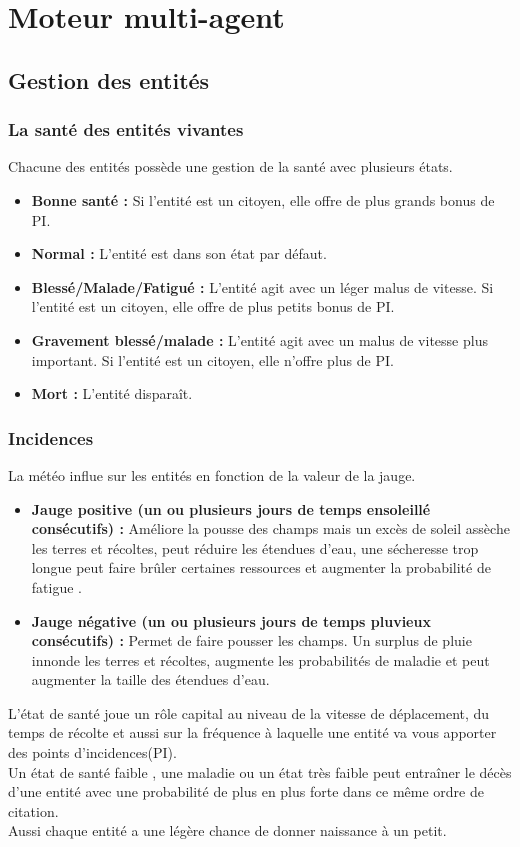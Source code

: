 \documentclass[a4paper]{memoir}
\begin{document}
		\section{Moteur multi-agent}
		
			\subsection{Gestion des entités}
			
				\subsubsection{La santé des entités vivantes}
					Chacune des entités possède une gestion de la santé avec plusieurs états.
					\begin{itemize}[label=$\bullet$]
						\item \textbf{Bonne santé :} Si l'entité est un citoyen, elle offre de plus grands bonus de PI.
						\item \textbf{Normal :} L'entité est dans son état par défaut.
						\item \textbf{Blessé/Malade/Fatigué :} L'entité agit avec un léger malus de vitesse. Si l'entité est un citoyen, elle offre de plus petits bonus de PI.
						\item \textbf{Gravement blessé/malade :} L'entité agit avec un malus de vitesse plus important. Si l'entité est un citoyen, elle n'offre plus de PI.
						\item \textbf{Mort :} L'entité disparaît.
					\end{itemize}
					
				\subsubsection{Incidences}
					\label{IncidenceE}
					La météo influe sur les entités en fonction de la valeur de la jauge.
					\begin{itemize}[label=$\bullet$]
						\item \textbf{Jauge positive (un ou plusieurs jours de temps ensoleillé consécutifs) :} Améliore la pousse des champs mais un excès de soleil assèche les terres et récoltes, peut réduire les étendues d'eau, une sécheresse trop longue peut faire brûler certaines ressources et augmenter la probabilité de fatigue .
						\item \textbf{Jauge négative (un ou plusieurs jours de temps pluvieux consécutifs) :} Permet de faire pousser les champs. Un surplus de pluie innonde les terres et récoltes, augmente les probabilités de maladie et peut augmenter la taille des étendues d'eau.
					\end{itemize}
					L'état de santé joue un rôle capital au niveau de la vitesse de déplacement, du temps de récolte et aussi sur la fréquence à laquelle une entité va vous apporter des points d'incidences(PI).\\
					Un état de santé faible , une maladie ou un état très faible peut entraîner le décès    d'une entité avec une probabilité de plus en plus forte dans ce même ordre de citation.\\
					Aussi chaque entité a une légère chance de donner naissance à un petit.
			
\end{document}
